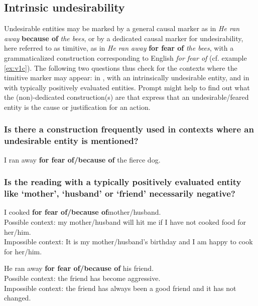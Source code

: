 \documentclass[output=paper,colorlinks,citecolor=brown]{langscibook}
\begin{document}
\subsection{Intrinsic undesirability}
\label{subsec:timintrinsic}

Undesirable entities may be marked by a general causal marker as in \textit{He ran away} \textbf{because of} \textit{the bees}, or by a dedicated causal marker for undesirability, here referred to as timitive, as in \textit{He ran away} \textbf{for fear of} \textit{the bees}, with a grammaticalized construction corresponding to English \textit{for fear of} (cf. example \ref{ex:v1c}). The following two questions thus check for the contexts where the timitive marker may appear: in , with an intrinsically undesirable entity, and in  with typically positively evaluated entities. Prompt  might help to find out what the (non)-dedicated construction(s) are that express that an undesirable/feared entity is the cause or justification for an action.

\subsubsection{Is there a construction frequently used in contexts where an undesirable entity is mentioned?}
\label{3.1.1}

\ea \label{p61} I ran away \textbf{for fear of/because of} the fierce dog.
\z

\subsubsection{Is the reading with a typically positively evaluated entity like `mother', `husband' or `friend' necessarily negative?}
\label{3.1.2}

\ea \label{p62} I cooked \textbf{for fear of/because of}mother\textnormal{/}husband. \\
\textnormal{Possible context: my mother/husband will hit me if I have not cooked food for her/him.} \\
    \textnormal{Impossible context: It is my mother/husband's birthday and I am happy to cook for her/him.}
\z

\ea \label{p63} He ran away \textbf{for fear of/because of} his friend.\\
\textnormal{Possible context: the friend has become aggressive.}\\
\textnormal{Impossible context: the friend has always been a good friend and it has not changed.}
\z
\end{document}
